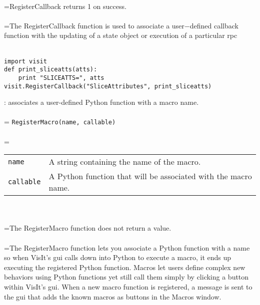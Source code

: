 \documentclass[10pt,a4paper]{report}
\begin{document}
 \\ 
\hangindent=\parindent RegisterCallback returns 1 on success. \\[-3mm] 

 \\ 
\hangindent=\parindent The RegisterCallback function is used to associate a user$-$defined callback function with the updating of a state object or execution of a particular rpc \\[-3mm] 

\\[-6mm]
\begin{verbatim}import visit
def print_sliceatts(atts):
    print "SLICEATTS=", atts
visit.RegisterCallback("SliceAttributes", print_sliceatts)
\end{verbatim}
\newpage


{}
: associates a user-defined Python function with a macro name.\\[-3mm]

 \\ 
\hangindent=\parindent 
\verb!RegisterMacro(name, callable)!\\ [-3mm]

 \\ 
\hangindent=\parindent 
\begin{tabular}{lp{9cm}}
\verb!name! & A string containing the name of the macro. \\
\verb!callable! & A Python function that will be associated with the macro name. \\
\end{tabular} \\[-2mm]


 \\ 
\hangindent=\parindent The RegisterMacro function does not return a value. \\[-3mm] 

 \\ 
\hangindent=\parindent The RegisterMacro function lets you associate a Python function with a name so when VisIt's gui calls down into Python to execute a macro, it ends up executing the registered Python function. Macros let users define complex new behaviors using Python functions yet still call them simply by clicking a button within VisIt's gui. When a new macro function is registered, a  message is sent to the gui that adds the known macros as buttons in the Macros window. \\[-3mm] 
\end{document}
